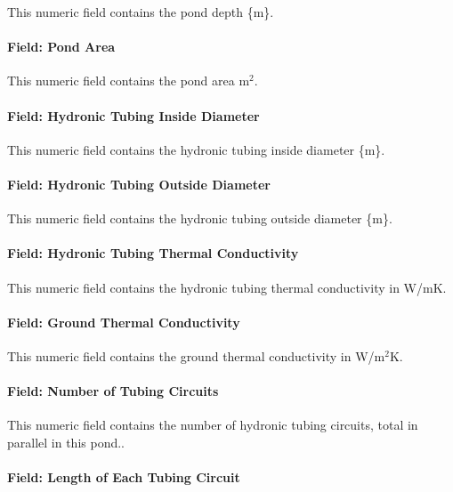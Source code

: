 This numeric field contains the pond depth \{m\}.

\paragraph{Field: Pond Area}\label{field-pond-area}

This numeric field contains the pond area m\(^{2}\).

\paragraph{Field: Hydronic Tubing Inside Diameter}\label{field-hydronic-tubing-inside-diameter}

This numeric field contains the hydronic tubing inside diameter \{m\}.

\paragraph{Field: Hydronic Tubing Outside Diameter}\label{field-hydronic-tubing-outside-diameter}

This numeric field contains the hydronic tubing outside diameter \{m\}.

\paragraph{Field: Hydronic Tubing Thermal Conductivity}\label{field-hydronic-tubing-thermal-conductivity}

This numeric field contains the hydronic tubing thermal conductivity in W/mK.

\paragraph{Field: Ground Thermal Conductivity}\label{field-ground-thermal-conductivity-1}

This numeric field contains the ground thermal conductivity in W/m\(^{2}\)K.

\paragraph{Field: Number of Tubing Circuits}\label{field-number-of-tubing-circuits}

This numeric field contains the number of hydronic tubing circuits, total in parallel in this pond..

\paragraph{Field: Length of Each Tubing Circuit}\label{field-length-of-each-tubing-circuit}

